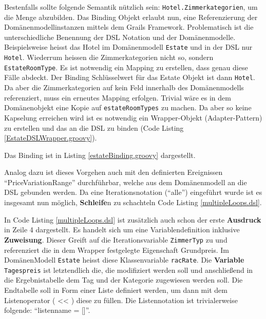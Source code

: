 \documentclass[11pt,english,ngerman, headsepline]{scrreprt}
\begin{document}
Bestenfalls sollte folgende Semantik nützlich sein:
\texttt{Hotel.Zimmerkategorien}, um die Menge abzubilden.
Das Binding Objekt erlaubt nun, eine Referenzierung der Domänenmodellinstanzen
mittels dem Grails Framework. Problematisch ist die unterschiedliche Benennung
der DSL Notation und der Domänenmodelle. Beispielsweise heisst das Hotel im
Domänenmodell \texttt{Estate} und in der DSL nur \texttt{Hotel}. Wiederrum heissen die
Zimmerkategorien nicht so, sondern \texttt{EstateRoomType}. Es ist
notwendig ein Mapping zu erstellen, dass genau diese Fälle abdeckt. Der Binding Schlüsselwert
für das Estate Objekt ist dann \texttt{Hotel}. 
Da aber die Zimmerkategorien auf kein Feld innerhalb des Domänenmodells
referenziert, muss ein erneutes Mapping erfolgen. Trivial wäre es in dem
Domänenobjekt eine Kopie auf \texttt{estateRoomTypes} zu machen. Da aber so keine
Kapselung erreichen wird ist es notwendig ein Wrapper-Objekt (Adapter-Pattern)
\cite{gamma1995design} zu erstellen und das an die DSL zu binden (Code Listing \ref{EstateDSLWrapper.groovy}).
 



Das Binding ist in Listing \ref{estateBinding.groovy} dargestellt.



Analog dazu ist dieses Vorgehen auch mit den definierten Ereignissen
``PriceVariationRange'' durchführbar, welche aus dem Domänenmodell an die DSL
gebunden werden. Da eine Iterationsnotation (``alle'') eingeführt wurde ist es
insgesamt nun möglich, {\bf Schleife}n zu schachteln Code Listing
\ref{multipleLoops.dsl}.
 


In Code Listing \ref{multipleLoops.dsl} ist zusätzlich auch schon der erste
{\bf Ausdruck} in Zeile 4 dargestellt. Es handelt sich um
eine Variablendefinition inklusive {\bf Zuweisung}. Dieser Greift auf
die Iterationsvariable \texttt{ZimmerTyp} zu und referenziert die in dem Wrapper
festgelegte Eigenschaft Grundpreis. Im DomänenModell \texttt{Estate} heisst diese
Klassenvariable \texttt{racRate}.
Die {\bf Variable} \texttt{Tagespreis} ist letztendlich die, die modifiziert
werden soll und anschließend in die Ergebnistabelle dem Tag und der
Kategorie zugewiesen werden soll. Die Endtabelle soll in Form einer Liste
definiert werden, um dann mit dem Listenoperator ( << ) diese
zu füllen. Die Listennotation ist trivialerweise folgende: ``listenname = []''.
\end{document}
